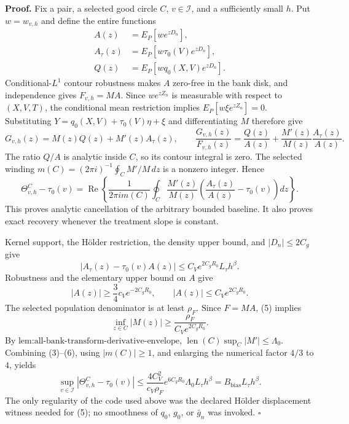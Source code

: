 \textbf{Proof.}
Fix a pair, a selected good circle \(C\), \(v\in\mathcal I\), and a sufficiently small \(h\). Put \(w=w_{v,h}\) and define the entire functions
\[
 \begin{aligned}
 A(z)&=E_P[we^{zD_n}],\\
 A_\tau(z)&=E_P[w\tau_0(V)e^{zD_n}],\\
 Q(z)&=E_P[wq_0(X,V)e^{zD_n}].
 \end{aligned} \tag{1}
\]
Conditional-\(L^1\) contour robustness makes \(A\) zero-free in the bank disk, and independence gives \(F_{v,h}=MA\). Since \(we^{zZ_n}\) is measurable with respect to \((X,V,T)\), the conditional mean restriction implies \(E_P[w\xi e^{zZ_n}]=0\). Substituting \(Y=q_0(X,V)+\tau_0(V)\eta+\xi\) and differentiating \(M\) therefore give
\[
 G_{v,h}(z)=M(z)Q(z)+M'(z)A_\tau(z),
 \qquad
 \frac{G_{v,h}(z)}{F_{v,h}(z)}
 =\frac{Q(z)}{A(z)}+\frac{M'(z)}{M(z)}\frac{A_\tau(z)}{A(z)}. \tag{2}
\]
The ratio \(Q/A\) is analytic inside \(C\), so its contour integral is zero. The selected winding \(m(C)=(2\pi i)^{-1}\oint_C M'/M\,dz\) is a nonzero integer. Hence
\[
 \Theta^C_{v,h}-\tau_0(v)
 =\operatorname{Re}\left\{
 \frac1{2\pi i m(C)}\oint_C\frac{M'(z)}{M(z)}
 \left(\frac{A_\tau(z)}{A(z)}-\tau_0(v)\right)dz
 \right\}. \tag{3}
\]
This proves analytic cancellation of the arbitrary bounded baseline. It also proves exact recovery whenever the treatment slope is constant.

Kernel support, the H\"older restriction, the density upper bound, and \(|D_n|\le2C_g\) give
\[
 |A_\tau(z)-\tau_0(v)A(z)|
 \le C_Ve^{2C_gR_0}L_\tau h^\beta. \tag{4}
\]
Robustness and the elementary upper bound on \(A\) give
\[
 |A(z)|\ge\frac34c_Ve^{-2C_gR_0},
 \qquad |A(z)|\le C_Ve^{2C_gR_0}. \tag{5}
\]
The selected population denominator is at least \(\rho_F\). Since \(F=MA\), (5) implies
\[
 \inf_{z\in C}|M(z)|
 \ge\frac{\rho_F}{C_Ve^{2C_gR_0}}. \tag{6}
\]
By \(\text{lem:all-bank-transform-derivative-envelope}\), \(\operatorname{len}(C)\sup_C|M'|\le\Lambda_0\). Combining (3)--(6), using \(|m(C)|\ge1\), and enlarging the numerical factor \(4/3\) to \(4\), yields
\[
 \sup_{v\in\mathcal I}|\Theta^C_{v,h}-\tau_0(v)|
 \le \frac{4C_V^2}{c_V\rho_F}e^{6C_gR_0}\Lambda_0
 L_\tau h^\beta
 =B_{\mathrm{bias}}L_\tau h^\beta. \tag{7}
\]
The only regularity of the code used above was the declared H\"older displacement witness needed for (5); no smoothness of \(q_0\), \(g_0\), or \(\bar g_n\) was invoked. \(\square\)